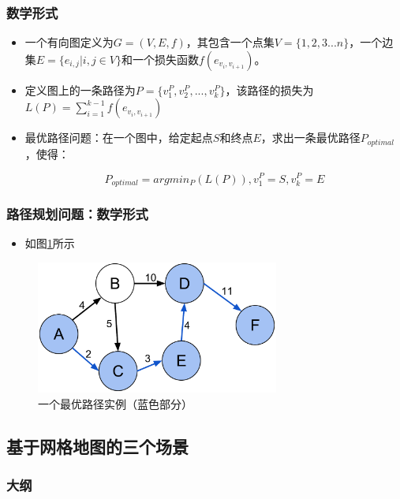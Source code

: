 \documentclass{beamer}
\begin{document}
\begin{frame}
\frametitle{数学形式}
\begin{itemize}

\item 一个有向图定义为$G=(V, E, f)$，其包含一个点集$V = \{1,2,3...n\}$，一个边集$E=\{e_{i,j}| i,j \in V \}$和一个损失函数$f(e_{v_i,v_{i+1}})$。
\item 定义图上的一条路径为$P=\{v_1^P, v_2^P,...,v_k^P\}$，该路径的损失为$L(P) = \sum_{i=1}^{k-1} f(e_{v_i,v_{i+1}})$
\item 最优路径问题：在一个图中，给定起点$S$和终点$E$，求出一条最优路径$P_{optimal}$，使得：
\begin{center}
    \begin{equation}
    P_{optimal} = argmin_{P}(L(P)), v_1^P = S, v_k^P = E
    \end{equation}
\end{center}

\end{itemize}
\end{frame}

\begin{frame}

\frametitle{路径规划问题：数学形式}
\begin{itemize}
    \item 如图\ref{fig:shortespath}所示
\end{itemize}
\begin{figure}
    \centering
    \includegraphics[width=8.0cm]{pic/2-1.pdf}
    \caption{一个最优路径实例（蓝色部分）}
    \label{fig:shortespath}
\end{figure}
\end{frame}

\subsection{基于网格地图的三个场景}
\begin{frame}
\frametitle{大纲} %
\tableofcontents
    [
        currentsection,
        currentsubsection,
        subsectionstyle=show/shaded/hide
    ]
\end{frame}
\end{document}
